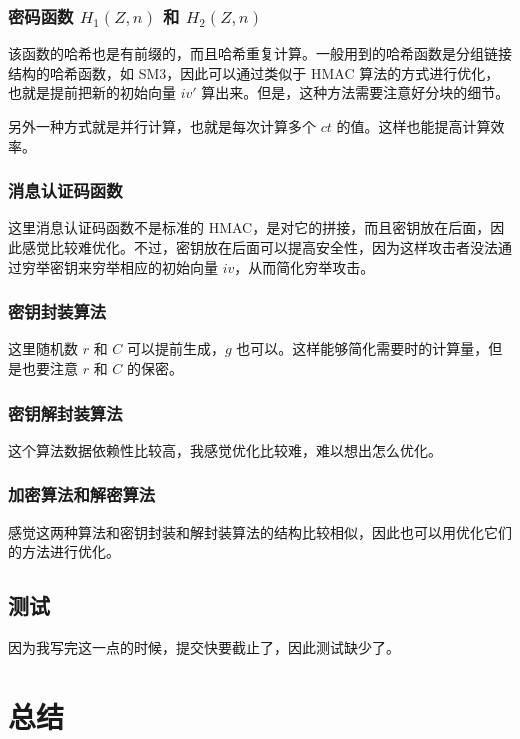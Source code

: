 \documentclass[12pt,a4paper]{article}
\begin{document}
\subsubsection*{密码函数 $ H_1(Z, n) $ 和 $ H_2(Z, n) $}

该函数的哈希也是有前缀的，而且哈希重复计算。一般用到的哈希函数是分组链接结构的哈希函数，如 SM3，因此可以通过类似于 HMAC 算法的方式进行优化，也就是提前把新的初始向量 $ {iv}' $ 算出来。但是，这种方法需要注意好分块的细节。

另外一种方式就是并行计算，也就是每次计算多个 $ {ct} $ 的值。这样也能提高计算效率。

\subsubsection*{消息认证码函数}

这里消息认证码函数不是标准的 HMAC，是对它的拼接，而且密钥放在后面，因此感觉比较难优化。不过，密钥放在后面可以提高安全性，因为这样攻击者没法通过穷举密钥来穷举相应的初始向量 $ {iv} $，从而简化穷举攻击。

\subsubsection*{密钥封装算法}

这里随机数 $ r $ 和 $ C $ 可以提前生成，$ g $ 也可以。这样能够简化需要时的计算量，但是也要注意 $ r $ 和 $ C $ 的保密。

\subsubsection*{密钥解封装算法}

这个算法数据依赖性比较高，我感觉优化比较难，难以想出怎么优化。

\subsubsection*{加密算法和解密算法}

感觉这两种算法和密钥封装和解封装算法的结构比较相似，因此也可以用优化它们的方法进行优化。

\subsection*{测试}

因为我写完这一点的时候，提交快要截止了，因此测试缺少了。

\section*{总结}
\end{document}
